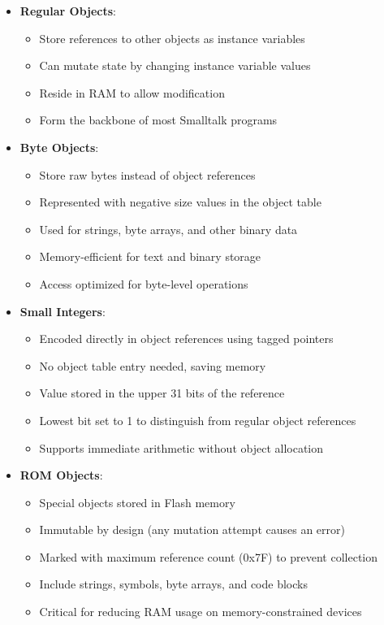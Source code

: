 \documentclass[12pt,a4paper]{report}
\begin{document}
\begin{itemize}
    \item \textbf{Regular Objects}:
    \begin{itemize}
        \item Store references to other objects as instance variables
        \item Can mutate state by changing instance variable values
        \item Reside in RAM to allow modification
        \item Form the backbone of most Smalltalk programs
    \end{itemize}
    
    \item \textbf{Byte Objects}:
    \begin{itemize}
        \item Store raw bytes instead of object references
        \item Represented with negative size values in the object table
        \item Used for strings, byte arrays, and other binary data
        \item Memory-efficient for text and binary storage
        \item Access optimized for byte-level operations
    \end{itemize}
    
    \item \textbf{Small Integers}:
    \begin{itemize}
        \item Encoded directly in object references using tagged pointers
        \item No object table entry needed, saving memory
        \item Value stored in the upper 31 bits of the reference
        \item Lowest bit set to 1 to distinguish from regular object references
        \item Supports immediate arithmetic without object allocation
    \end{itemize}
    
    \item \textbf{ROM Objects}:
    \begin{itemize}
        \item Special objects stored in Flash memory
        \item Immutable by design (any mutation attempt causes an error)
        \item Marked with maximum reference count (0x7F) to prevent collection
        \item Include strings, symbols, byte arrays, and code blocks
        \item Critical for reducing RAM usage on memory-constrained devices
    \end{itemize}
\end{itemize}
\end{document}
